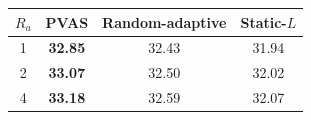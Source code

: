 \begin{tabular}{cccc}
\toprule
$R_a$ & PVAS & Random-adaptive & Static-$L$ \\
\midrule
1 & \textbf{32.85} & 32.43 & 31.94 \\
2 & \textbf{33.07} & 32.50 & 32.02 \\
4 & \textbf{33.18} & 32.59 & 32.07 \\
\bottomrule
\end{tabular}

